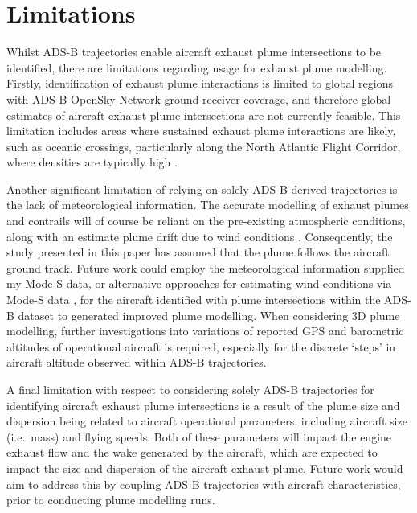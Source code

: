 \section{Limitations}
Whilst ADS-B trajectories enable aircraft exhaust plume intersections to be identified, there are limitations regarding usage for exhaust plume modelling. Firstly, identification of exhaust plume interactions is limited to global regions with ADS-B OpenSky Network ground receiver coverage, and therefore global estimates of aircraft exhaust plume intersections are not currently feasible. This limitation includes areas where sustained exhaust plume interactions are likely, such as oceanic crossings, particularly along the North Atlantic Flight Corridor, where densities are typically high \cite{Schlager1997}.

Another significant limitation of relying on solely ADS-B derived-trajectories is the lack of meteorological information. The accurate modelling of exhaust plumes and contrails will of course be reliant on the pre-existing atmospheric conditions, along with an estimate plume drift due to wind conditions \cite{Gruber2018}. Consequently, the study presented in this paper has assumed that the plume follows the aircraft ground track. Future work could employ the meteorological information supplied my Mode-S data, or alternative approaches for estimating wind conditions via Mode-S data \cite{Sun2018}, for the aircraft identified with plume intersections within the ADS-B dataset to generated improved plume modelling. When considering 3D plume modelling, further investigations into variations of reported GPS and barometric altitudes of operational aircraft is required, especially for the discrete `steps' in aircraft altitude observed within ADS-B trajectories.

A final limitation with respect to considering solely ADS-B trajectories for identifying aircraft exhaust plume intersections is a result of the plume size and dispersion being related to aircraft operational parameters, including aircraft size (i.e.\ mass) and flying speeds. Both of these parameters will impact the engine exhaust flow and the wake generated by the aircraft, which are expected to impact the size and dispersion of the aircraft exhaust plume. Future work would aim to address this by coupling ADS-B trajectories with aircraft characteristics, prior to conducting plume modelling runs.